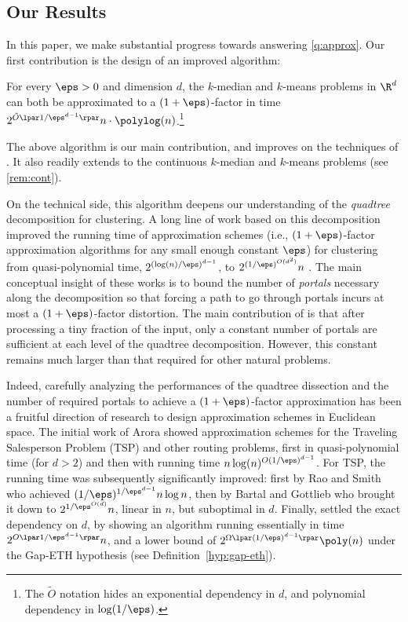 \subsection{Our Results}
In this paper, we make substantial progress towards answering \cref{q:approx}. Our first contribution is the design of an improved algorithm:

\begin{theorem}\label{thm:mainAlgo}
    For every $\eps > 0$ and dimension $d$, the $k$-median and $k$-means problems in $\R^d$ can both be  approximated to a $(1+\eps)$-factor in time $2^{\tilde O\lpar 1/\eps^{d-1}\rpar} n \cdot \polylog(n)$.\footnote{The $\tilde O$ notation hides an exponential dependency in $d$, and polynomial dependency in $\log(1/\eps)$.}
\end{theorem}

The above algorithm is our main contribution, and improves on the techniques of \cite{jacm}. It also readily extends to the continuous $k$-median and $k$-means problems (see \cref{rem:cont}). 

On the technical side, this algorithm deepens our understanding of the \emph{quadtree} decomposition for clustering.
A long line of work based on this decomposition \cite{AroraRR98, KolliopoulosR07, FriggstadRS19, Cohen-AddadKM19, Cohen-Addad18, jacm} improved the running time of approximation schemes (i.e., $(1+\eps)$-factor approximation
algorithms for any small enough constant $\eps$) for clustering from quasi-polynomial time, $2^{(\log(n)/\eps)^{d-1}}$, to  $2^{(1/\eps)^{O(d^2)}} n$ \cite{jacm}. 
The main conceptual insight of these works is to bound the number of \emph{portals} necessary along the decomposition so that forcing a path to go through portals incurs at most a $(1+\eps)$-factor distortion.
The main contribution of \cite{jacm} is that after processing a tiny fraction of the input, only a constant number of portals are sufficient at each level of the quadtree decomposition.
However, this constant remains much larger than that required for other natural problems.

Indeed, carefully analyzing the performances of the quadtree dissection and the number of required portals to achieve a $(1+\eps)$-factor approximation has been a fruitful direction of research to design approximation schemes in Euclidean space.
The initial work of Arora \cite{Arora96, Arora98} showed approximation schemes for the Traveling Salesperson Problem (TSP) and other routing problems, first in quasi-polynomial time (for $d > 2$) and then with running time $n \log(n)^{O(1/\eps)^{d-1}}$. 
For TSP, the running time was subsequently significantly improved: first by Rao and Smith~\cite{rao1998approximating} who achieved $(1/\eps)^{1/\eps^{d-1}} n \log n$, then by Bartal and Gottlieb \cite{BartalG13} who brought it down to $2^{1/\eps^{O(d)}} n$, linear in $n$, but suboptimal in $d$. 
Finally, \cite{Kisfaludi-BakNW21} settled the exact dependency on $d$, by showing an algorithm running essentially in time $2^{O\lpar 1/\eps^{d-1}\rpar} n$, and a lower bound of $2^{\Omega\lpar (1/\eps)^{d-1}\rpar} \poly(n)$ under the Gap-ETH hypothesis \cite{D16,MR16} (see Definition~\ref{hyp:gap-eth}).

